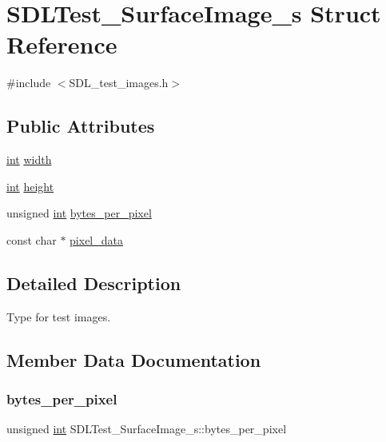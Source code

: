 \hypertarget{struct_s_d_l_test___surface_image__s}{}\section{S\+D\+L\+Test\+\_\+\+Surface\+Image\+\_\+s Struct Reference}
\label{struct_s_d_l_test___surface_image__s}


{\ttfamily \#include $<$S\+D\+L\+\_\+test\+\_\+images.\+h$>$}

\subsection*{Public Attributes}
\begin{DoxyCompactItemize}
\item 
\mbox{\hyperlink{warnings_8h_a74f207b5aa4ba51c3a2ad59b219a423b}{int}} \mbox{\hyperlink{struct_s_d_l_test___surface_image__s_a3cbacf6b015a22832ab4d3f509719609}{width}}
\item 
\mbox{\hyperlink{warnings_8h_a74f207b5aa4ba51c3a2ad59b219a423b}{int}} \mbox{\hyperlink{struct_s_d_l_test___surface_image__s_a310092874695556e4b7f1f63aec24213}{height}}
\item 
unsigned \mbox{\hyperlink{warnings_8h_a74f207b5aa4ba51c3a2ad59b219a423b}{int}} \mbox{\hyperlink{struct_s_d_l_test___surface_image__s_a2daf91bab3d79fb9dfa25e8ade43e606}{bytes\+\_\+per\+\_\+pixel}}
\item 
const char $\ast$ \mbox{\hyperlink{struct_s_d_l_test___surface_image__s_acf2d3006bea5690f564d3003d1512fa7}{pixel\+\_\+data}}
\end{DoxyCompactItemize}


\subsection{Detailed Description}
Type for test images. 

\subsection{Member Data Documentation}
\mbox{\label{struct_s_d_l_test___surface_image__s_a2daf91bab3d79fb9dfa25e8ade43e606}} 
\subsubsection{\texorpdfstring{bytes\_per\_pixel}{bytes\_per\_pixel}}
{\footnotesize\ttfamily unsigned \mbox{\hyperlink{warnings_8h_a74f207b5aa4ba51c3a2ad59b219a423b}{int}} S\+D\+L\+Test\+\_\+\+Surface\+Image\+\_\+s\+::bytes\+\_\+per\+\_\+pixel}

